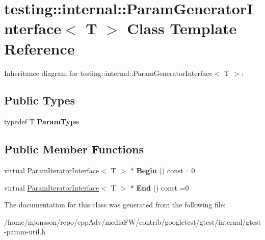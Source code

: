 \hypertarget{classtesting_1_1internal_1_1ParamGeneratorInterface}{}\section{testing\+:\+:internal\+:\+:Param\+Generator\+Interface$<$ T $>$ Class Template Reference}
\label{classtesting_1_1internal_1_1ParamGeneratorInterface}


Inheritance diagram for testing\+:\+:internal\+:\+:Param\+Generator\+Interface$<$ T $>$\+:
\subsection*{Public Types}
\begin{DoxyCompactItemize}
\item 
\mbox{\label{classtesting_1_1internal_1_1ParamGeneratorInterface_ab33d2ea424c50beaf503cb125b3cd003}} 
typedef T {\bfseries Param\+Type}
\end{DoxyCompactItemize}
\subsection*{Public Member Functions}
\begin{DoxyCompactItemize}
\item 
\mbox{\label{classtesting_1_1internal_1_1ParamGeneratorInterface_ae1de83b16fe9a53c67778a026c6a9569}} 
virtual \hyperlink{classtesting_1_1internal_1_1ParamIteratorInterface}{Param\+Iterator\+Interface}$<$ T $>$ $\ast$ {\bfseries Begin} () const =0
\item 
\mbox{\label{classtesting_1_1internal_1_1ParamGeneratorInterface_afa7211b74990e11d3fc7ad4e7113da4f}} 
virtual \hyperlink{classtesting_1_1internal_1_1ParamIteratorInterface}{Param\+Iterator\+Interface}$<$ T $>$ $\ast$ {\bfseries End} () const =0
\end{DoxyCompactItemize}


The documentation for this class was generated from the following file\+:\begin{DoxyCompactItemize}
\item 
/home/mjonsson/repo/cpp\+Adv/media\+F\+W/contrib/googletest/gtest/internal/gtest-\/param-\/util.\+h\end{DoxyCompactItemize}
